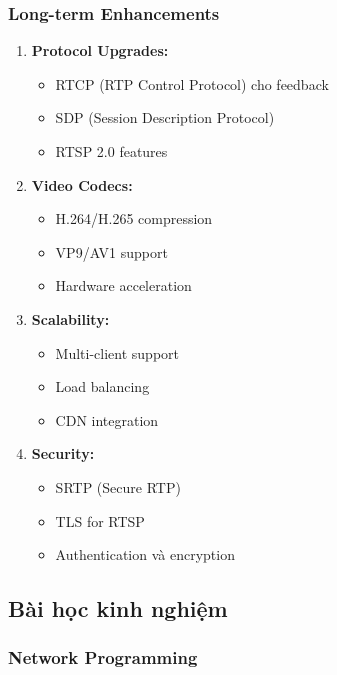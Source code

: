 \subsubsection{Long-term Enhancements}

\begin{enumerate}
    \item \textbf{Protocol Upgrades:}
    \begin{itemize}
        \item RTCP (RTP Control Protocol) cho feedback
        \item SDP (Session Description Protocol)
        \item RTSP 2.0 features
    \end{itemize}
    
    \item \textbf{Video Codecs:}
    \begin{itemize}
        \item H.264/H.265 compression
        \item VP9/AV1 support
        \item Hardware acceleration
    \end{itemize}
    
    \item \textbf{Scalability:}
    \begin{itemize}
        \item Multi-client support
        \item Load balancing
        \item CDN integration
    \end{itemize}
    
    \item \textbf{Security:}
    \begin{itemize}
        \item SRTP (Secure RTP)
        \item TLS for RTSP
        \item Authentication và encryption
    \end{itemize}
\end{enumerate}

\subsection{Bài học kinh nghiệm}

\subsubsection{Network Programming}

